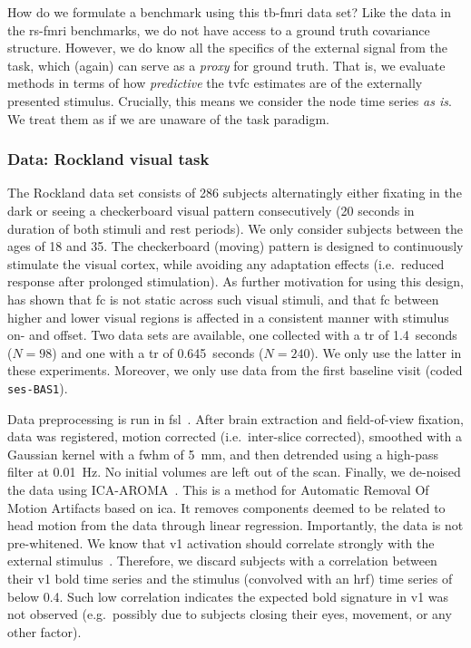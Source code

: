 How do we formulate a benchmark using this \gls{tb-fmri} data set?
Like the data in the \gls{rs-fmri} benchmarks, we do not have access to a ground truth covariance structure.
However, we do know all the specifics of the external signal from the task, which (again) can serve as a \emph{proxy} for ground truth.
That is, we evaluate methods in terms of how \emph{predictive} the \gls{tvfc} estimates are of the externally presented stimulus.
Crucially, this means we consider the node time series \emph{as is}.
We treat them as if we are unaware of the task paradigm.

\subsubsection{Data: Rockland visual task}
\label{subsec:rockland-data}

The Rockland data set consists of 286 subjects alternatingly either fixating in the dark or seeing a checkerboard visual pattern consecutively (20 seconds in duration of both stimuli and rest periods).
We only consider subjects between the ages of 18 and 35.
The checkerboard (moving) pattern is designed to continuously stimulate the visual cortex, while avoiding any adaptation effects (i.e.~reduced response after prolonged stimulation).
As further motivation for using this design, \textcite{Di2015} has shown that \gls{fc} is not static across such visual stimuli, and that \gls{fc} between higher and lower visual regions is affected in a consistent manner with stimulus on- and offset.
%
Two data sets are available, one collected with a \gls{tr} of 1.4~seconds ($N = 98$) and one with a \gls{tr} of 0.645~seconds ($N = 240$).
We only use the latter in these experiments.
Moreover, we only use data from the first baseline visit (coded \texttt{ses-BAS1}).

Data preprocessing is run in \gls{fsl}~\parencite{Jenkinson2012}.
After brain extraction and field-of-view fixation, data was registered, motion corrected (i.e.~inter-slice corrected), smoothed with a Gaussian kernel with a \gls{fwhm} of 5~mm, and then detrended using a high-pass filter at 0.01~Hz.
No initial volumes are left out of the scan.
Finally, we de-noised the data using ICA-AROMA~\parencite{Pruim2015a, Pruim2015b}.
This is a method for Automatic Removal Of Motion Artifacts based on \gls{ica}.
It removes components deemed to be related to head motion from the data through linear regression.
Importantly, the data is not pre-whitened.
%
We know that \gls{v1} activation should correlate strongly with the external stimulus~\parencite{Sahib2018}.
Therefore, we discard subjects with a correlation between their \gls{v1} \gls{bold} time series and the stimulus (convolved with an \gls{hrf}) time series of below 0.4.
Such low correlation indicates the expected \gls{bold} signature in \gls{v1} was not observed (e.g.~possibly due to subjects closing their eyes, movement, or any other factor).


